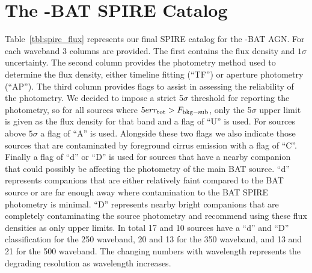 \section{The \herschel-BAT SPIRE Catalog}
Table~\ref{tbl:spire_flux} represents our final SPIRE catalog for the \herschel-BAT AGN. For each waveband 3 columns are provided. The first contains the flux density and $1\sigma$ uncertainty. The second column provides the photometry method used to determine the flux density, either timeline fitting (``TF'') or aperture photometry (``AP''). The third column provides flags to assist in assessing the reliability of the photometry. We decided to impose a strict 5$\sigma$ threshold for reporting the photometry, so for all sources where $5 err_{\rm{tot}} > F_{\rm{bkg-sub}}$, only the 5$\sigma$ upper limit is given as the flux density for that band and a flag of ``U'' is used. For sources above $5\sigma$ a flag of ``A'' is used. Alongside these two flags we also indicate those sources that are contaminated by foreground cirrus emission with a flag of ``C''. Finally a flag of ``d'' or ``D'' is used for sources that have a nearby companion that could possibly be affecting the photometry of the main BAT source. ``d'' represents companions that are either relatively faint compared to the BAT source or are far enough away where contamination to the BAT SPIRE photometry is minimal. ``D'' represents nearby bright companions that are completely contaminating the source photometry and recommend using these flux densities as only upper limits. In total 17 and 10 sources have a ``d'' and ``D'' classification for the 250 \um{} waveband, 20 and 13 for the 350 \um{} waveband, and 13 and 21 for the 500 \um{} waveband. The changing numbers with wavelength represents the degrading resolution as wavelength increases.
  
  
  